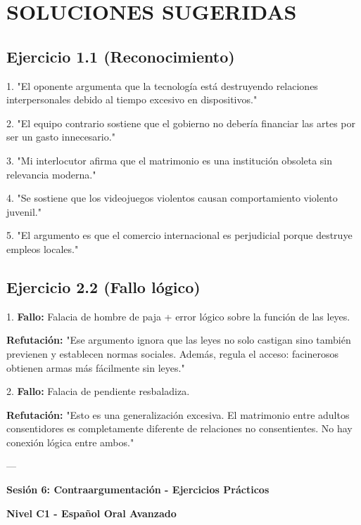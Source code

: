 \documentclass[a4paper,11pt]{article}
\begin{document}
\section{SOLUCIONES SUGERIDAS}

\vspace{0.2cm}

\subsection{Ejercicio 1.1 (Reconocimiento)}

1. "El oponente argumenta que la tecnología está destruyendo relaciones interpersonales debido al tiempo excesivo en dispositivos."

2. "El equipo contrario sostiene que el gobierno no debería financiar las artes por ser un gasto innecesario."

3. "Mi interlocutor afirma que el matrimonio es una institución obsoleta sin relevancia moderna."

4. "Se sostiene que los videojuegos violentos causan comportamiento violento juvenil."

5. "El argumento es que el comercio internacional es perjudicial porque destruye empleos locales."

\vspace{0.2cm}

\subsection{Ejercicio 2.2 (Fallo lógico)}

1. \textbf{Fallo:} Falacia de hombre de paja + error lógico sobre la función de las leyes.

\textbf{Refutación:} "Ese argumento ignora que las leyes no solo castigan sino también previenen y establecen normas sociales. Además, regula el acceso: facinerosos obtienen armas más fácilmente sin leyes."

\vspace{0.2cm}

2. \textbf{Fallo:} Falacia de pendiente resbaladiza.

\textbf{Refutación:} "Esto es una generalización excesiva. El matrimonio entre adultos consentidores es completamente diferente de relaciones no consentientes. No hay conexión lógica entre ambos."

\vspace{0.2cm}

---

\vspace{0.2cm}

\textbf{Sesión 6: Contraargumentación - Ejercicios Prácticos}

\textbf{Nivel C1 - Español Oral Avanzado}

\vspace{0.2cm}
\end{document}
